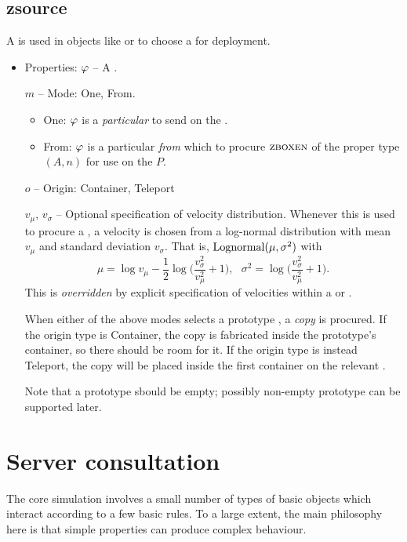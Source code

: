 \subsection{zsource}
\label{sec:zsource}
A  is used in objects like  or
 to choose a  for deployment.

\begin{itemize}
\item Properties:
  ${\varphi}$ -- A .

  $m$ -- Mode: One, From.
  \begin{itemize}
    \item One: ${\varphi}$ is a \emph{particular}  to send on the .

    \item From: ${\varphi}$ is a particular  \emph{from} which to procure ${\textsc{zboxen}}$
      of the proper type $(A,n)$ for use on the  $P$.
  \end{itemize}

  $o$ -- Origin: Container, Teleport

  $v_\mu$, $v_\sigma$ -- Optional specification of velocity distribution.
  Whenever this  is used to procure a , a velocity is chosen from
  a log-normal distribution with mean $v_\mu$ and standard deviation $v_\sigma$.
  That is, $\textup{Lognormal}(\mu,\sigma^2)$ with
  \[
    \mu = \log v_\mu - \frac12\log \big(\frac{v_\sigma^2}{v_\mu^2} + 1\big),\ \ \   \sigma^2
      = \log\big( \frac{v_\sigma^2}{v_\mu^2} + 1 \big)
  .\]
  This is \emph{overridden} by explicit specification of velocities within a
   or . 
  
  When either of the above modes selects a prototype , a \emph{copy} is procured.
  If the origin type is Container, the copy is fabricated inside the
  prototype's container, so there should be room for it.  If the
  origin type is instead Teleport, the copy will be placed inside the
  first container on the relevant .

  Note that a prototype  sbould be empty; possibly
  non-empty prototype  can be supported later.

\end{itemize}



\section{Server consultation}
\label{Servers}
\label{servercon}
The core simulation involves a small number of types of basic objects
which interact according to a few basic rules. To a large extent, the
main philosophy here is that simple properties can produce complex
behaviour.

